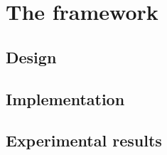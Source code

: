 \chapter{The framework}
\label{chap:framework}
\section{Design}
\todo
\section{Implementation}
\todo
\section{Experimental results}
\todo
